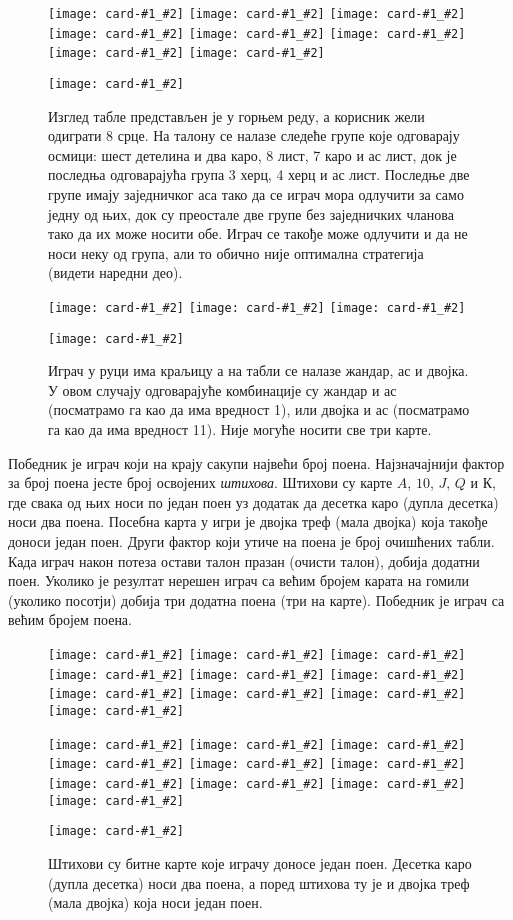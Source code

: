 \documentclass[a4paper, 12pt, ngerman]{article}
\newcommand{\quotesrb}[1]{\glqq#1\grqq}
\newcommand{\card}[2]{\texttt{[image: card-\#1\_\#2]}}
\newcommand{\cardmed}[2]{\texttt{[image: card-\#1\_\#2]}}
\begin{document}
\begin{figure}[htbp]
	\centering
	\card{6}{club}
	\card{2}{diamond}
	\card{jack}{club}
	\card{8}{spade}
	\card{3}{heart}
	\card{7}{diamond}
	\card{4}{heart}
	\card{1}{spade}
	
	\card{8}{heart}
	\caption{Изглед табле представљен је у горњем реду, а корисник жели одиграти 8 срце. На талону се налазе следеће групе које одговарају осмици: шест детелина и два каро, 8 лист, 7 каро и ас лист, док је последња одговарајућа група 3 херц, 4 херц и ас лист. Последње две групе имају заједничког аса тако да се играч мора одлучити за само једну од њих, док су преостале две групе без заједничких чланова тако да их може носити обе. Играч се такође може одлучити и да не носи неку од група, али то обично није оптимална стратегија (видети наредни део).}
\end{figure}


\begin{figure}[htbp]
	\centering
	\card{jack}{heart}
	\card{1}{spade}
	\card{2}{diamond}
		
	\card{queen}{heart}
	\caption{Играч у руци има краљицу а на табли се налазе жандар, ас и двојка. У овом случају одговарајуће комбинације су жандар и ас (посматрамо га као да има вредност 1), или двојка и ас (посматрамо га као да има вредност 11). Није могуће носити све три карте.}
\end{figure}


Победник је играч који на крају сакупи највећи број поена. Најзначајнији фактор за број поена јесте број освојених \textit{штихова}. Штихови су карте $A$, $10$, $J$, $Q$ и $К$, где свака од њих носи по један поен уз додатак да десетка каро (дупла десетка) носи два поена. Посебна карта у игри је двојка треф (мала двојка) која такође доноси један поен. Други фактор који утиче на поена је број \quotesrb{очишћених} табли. Када играч након потеза остави талон празан (очисти талон), добија додатни поен. Уколико је резултат нерешен играч са већим бројем карата на гомили (уколико посотји) добија три додатна поена (три на карте). Победник је играч са већим бројем поена.

\begin{figure}[htbp]
	\centering
	\cardmed{1}{spade}
	\cardmed{10}{spade}
	\cardmed{jack}{spade}
	\cardmed{queen}{spade}
	\cardmed{king}{spade}
	\cardmed{1}{heart}
	\cardmed{10}{heart}
	\cardmed{jack}{heart}
	\cardmed{queen}{heart}
	\cardmed{king}{heart}
	
	\cardmed{1}{club}
	\cardmed{10}{club}
	\cardmed{jack}{club}
	\cardmed{queen}{club}
	\cardmed{king}{club}
	\cardmed{1}{diamond}
	\cardmed{10}{diamond}
	\cardmed{jack}{diamond}
	\cardmed{queen}{diamond}
	\cardmed{king}{diamond}
	
	\cardmed{2}{club}
	\caption{Штихови су битне карте које играчу доносе један поен. Десетка каро (дупла десетка) носи два поена, а поред штихова ту је и двојка треф (мала двојка) која носи један поен.}
\end{figure}
\end{document}
